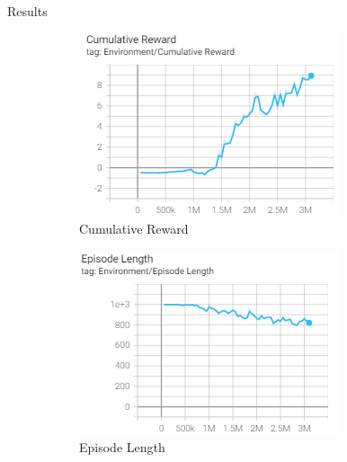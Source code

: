 \documentclass[final]{beamer}
\newlength{\onecolwid}
\newlength{\twocolwid}
\begin{document}
\begin{frame}[t]
\begin{columns}[t]
\begin{column}{\twocolwid}
\begin{columns}[t,totalwidth=\twocolwid]
\begin{column}{\onecolwid}
\begin{block}{Results}
\begin{figure}
    \begin{subfigure}[b]{0.4\textwidth}
        \includegraphics[width=\textwidth]{cum_reward.PNG}
        \caption{Cumulative Reward}
        \label{fig:Cum Reward}
    \end{subfigure}
    \begin{subfigure}[b]{0.4\textwidth}
        \includegraphics[width=\textwidth]{ep_len.PNG}
        \caption{Episode Length}
        \label{fig:episode length}
    \end{subfigure}
    \begin{subfigure}[b]{0.4\textwidth}

\end{subfigure}
\end{figure}
\end{block}
\end{column}
\end{columns}
\end{column}
\end{columns}
\end{frame}
\end{document}
